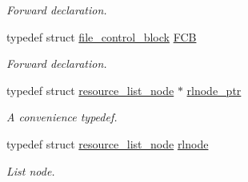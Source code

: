 \begin{DoxyCompactItemize}
\begin{DoxyCompactList}\small\item\em Forward declaration. \end{DoxyCompactList}\item 
typedef struct \hyperlink{structfile__control__block}{file\+\_\+control\+\_\+block} \hyperlink{group__rlists_ga60c6c294fa1d8ea73ed270404fe5c17d}{F\+CB}\hypertarget{group__rlists_ga60c6c294fa1d8ea73ed270404fe5c17d}{}\label{group__rlists_ga60c6c294fa1d8ea73ed270404fe5c17d}

\begin{DoxyCompactList}\small\item\em Forward declaration. \end{DoxyCompactList}\item 
typedef struct \hyperlink{structresource__list__node}{resource\+\_\+list\+\_\+node} $\ast$ \hyperlink{group__rlists_gaae2ea9be18d20f0c80a62a2f8e2eed4d}{rlnode\+\_\+ptr}\hypertarget{group__rlists_gaae2ea9be18d20f0c80a62a2f8e2eed4d}{}\label{group__rlists_gaae2ea9be18d20f0c80a62a2f8e2eed4d}

\begin{DoxyCompactList}\small\item\em A convenience typedef. \end{DoxyCompactList}\item 
typedef struct \hyperlink{structresource__list__node}{resource\+\_\+list\+\_\+node} \hyperlink{group__rlists_ga8f6244877f7ce2322c90525217ea6e7a}{rlnode}\hypertarget{group__rlists_ga8f6244877f7ce2322c90525217ea6e7a}{}\label{group__rlists_ga8f6244877f7ce2322c90525217ea6e7a}

\begin{DoxyCompactList}\small\item\em List node. \end{DoxyCompactList}\end{DoxyCompactItemize}
